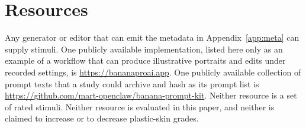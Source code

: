 \documentclass[10pt,twocolumn]{article}
\begin{document}
\section{Resources}
\label{app:resources}

Any generator or editor that can emit the metadata in Appendix~\ref{app:meta} can supply stimuli. One publicly available implementation, listed here only as an example of a workflow that can produce illustrative portraits and edits under recorded settings, is \url{https://bananaproai.app}. One publicly available collection of prompt texts that a study could archive and hash as its prompt list is \url{https://github.com/mart-openclaw/banana-prompt-kit}. Neither resource is a set of rated stimuli. Neither resource is evaluated in this paper, and neither is claimed to increase or to decrease plastic-skin grades.
\end{document}
